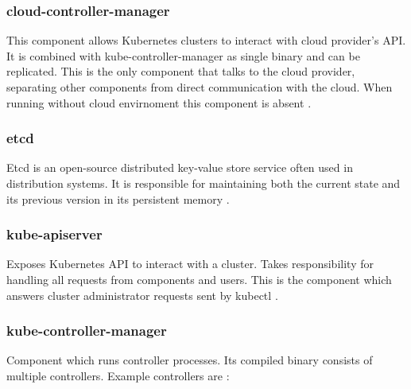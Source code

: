 
\subsubsection{cloud-controller-manager}
\label{sec:cloudControllerManager}

This component allows Kubernetes clusters to interact with cloud provider's API. It is combined with kube-controller-manager as single binary and can be replicated. This is the only component that talks to the cloud provider, separating other components from direct communication with the cloud. When running without cloud envirnoment this component is absent \cite{KubernetesArch}.


\subsubsection{etcd}
\label{sec:etcd}

Etcd is an open-source distributed key-value store service often used in distribution systems. It is responsible for maintaining both the current state and its previous version in its persistent memory \cite{KubernetesArch}\cite{Etcd}.


\subsubsection{kube-apiserver}
\label{sec:kubeApiServer}

Exposes Kubernetes API to interact with a cluster. Takes responsibility for handling all requests from components and users. This is the component which answers cluster administrator requests sent by kubectl \cite{KubernetesArch}.


\subsubsection{kube-controller-manager}
\label{sec:kubeControllerManager}

Component which runs controller processes. Its compiled binary consists of multiple controllers. Example controllers are \cite{KubernetesArch}:

